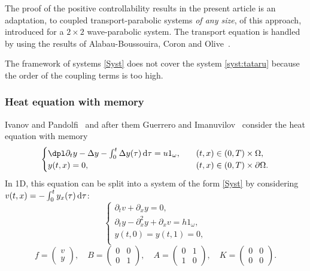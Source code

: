 \documentclass[JEP,XML,SOM,Unicode,NoEqCountersInSection]{cedram}
\theoremstyle{plain}
\theoremstyle{definition}
\theoremstyle{remark}
\newcommand{\diff}[1][-3]{\ensuremath{\mathop{}\mkern#1mu\mathrm{d}}}
\begin{document}
The proof of the positive controllability results in the present article is an adaptation, to coupled transport-parabolic systems \emph{of any size}, of this approach, introduced for a $2\times2$ wave-parabolic system. The transport equation is handled by using the results of Alabau-Boussouira, Coron and Olive~\cite{alabau-boussouira_2017}.

The framework of systems \eqref{Syst} does not cover the system \eqref{syst:tataru} because the order of the coupling terms is too high.

\subsubsection{Heat equation with memory}
Ivanov and Pandolfi~\cite{ivanov_2009} and after them Guerrero and Imanuvilov~\cite{guerrero_2013} consider the heat equation with memory
\begin{equation} \label{chaleur_mem}
\begin{cases}
\dpl\partial_t y - \Delta y - \int_0^t \Delta y (\tau) \diff \tau = u 1_\omega, \quad & (t,x)\in(0,T)\times\Omega, \\
y(t,x)=0, & (t,x)\in(0,T)\times\partial\Omega.
\end{cases}
\end{equation}
In 1D, this equation can be split into a system of the form \eqref{Syst} by considering $v(t,x)=-\int_0^t y_x(\tau) \diff \tau$:
\begin{equation} \label{chaleur_mem_syst}
\begin{cases}
\partial_t v +\partial_x y = 0, \\
\partial_t y - \partial_x^2 y + \partial_xv = h 1_{\omega}, \\
y(t,0)=y(t,1)=0, \\
\end{cases}
\end{equation}
\ie
\[
f=\begin{pmatrix}
v \\ y
\end{pmatrix}, \quad
B=\begin{pmatrix}
0 & 0 \\ 0 & 1
\end{pmatrix}, \quad
A=\begin{pmatrix}
0 & 1 \\ 1 & 0
\end{pmatrix}, \quad
K=\begin{pmatrix}
0 & 0 \\ 0 & 0
\end{pmatrix}.
\]
\end{document}
